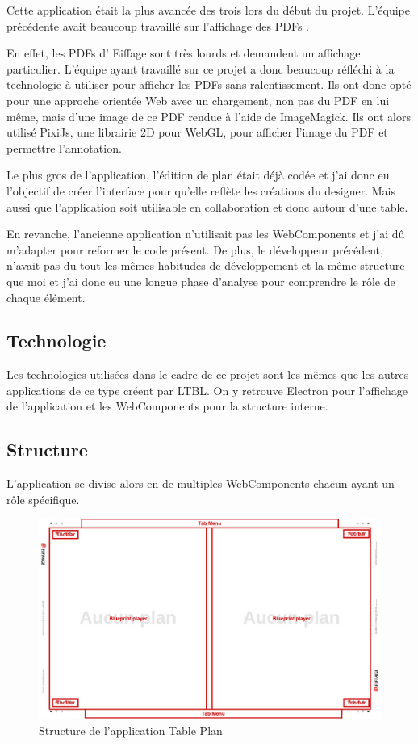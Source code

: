 Cette application était la plus avancée des trois lors du début du projet.
L'équipe précédente avait beaucoup travaillé sur l'affichage des PDFs .

En effet, les PDFs d’ Eiffage sont très lourds et demandent un affichage particulier.
L'équipe ayant travaillé sur ce projet a donc beaucoup réfléchi à la technologie à utiliser pour afficher les PDFs sans ralentissement.
Ils ont donc opté pour une approche orientée Web avec un chargement, non pas du PDF en lui même, mais d'une image de ce PDF rendue à l'aide de ImageMagick.
Ils ont alors utilisé PixiJs, une librairie 2D pour WebGL, pour afficher l'image du PDF et permettre l'annotation.

Le plus gros de l'application, l'édition de plan était déjà codée et j'ai donc eu l'objectif de créer l'interface pour qu'elle reflète les créations du designer.
Mais aussi que l'application soit utilisable en collaboration et donc autour d'une table.

En revanche, l'ancienne application n'utilisait pas les WebComponents et j'ai dû m'adapter pour reformer le code présent.
De plus, le développeur précédent, n'avait pas du tout les mêmes habitudes de développement et la même structure que moi et j'ai donc eu une longue phase d'analyse pour comprendre le rôle de chaque élément.

\subsection{Technologie}
\label{eiffageTablePlanTechnologie}

Les technologies utilisées dans le cadre de ce projet sont les mêmes que les autres applications de ce type créent par LTBL.
On y retrouve Electron pour l'affichage de l'application et les WebComponents pour la structure interne.

\subsection{Structure}
\label{eiffageTablePlanStructure}

L'application se divise alors en de multiples WebComponents chacun ayant un rôle spécifique.

\begin{figure}[h]
    \centering
    \includegraphics[scale=0.5]{img/table-plan-structure.pdf}
    \caption{Structure de l'application Table Plan}
\end{figure}


